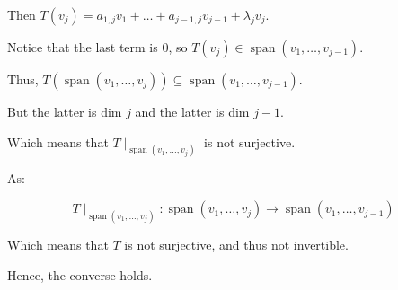 {{{			Then \(T(v_{j}) = a_{1,j} v_1 + \ldots + a_{j-1,j} v_{j-1} + \lambda_{j} v_{j}\).

			Notice that the last term is \(0\), so \(T(v_{j}) \in \operatorname{span}\left( v_1, \ldots, v_{j-1} \right) \).

			Thus, \( T(\operatorname{span}\left( v_1, \ldots, v_{j} \right)) \subseteq \operatorname{span}\left( v_1, \ldots, v_{j-1} \right) \).

			But the latter is dim \(j\) and the latter is dim \(j - 1\).

			Which means that \(T \mid_{\operatorname{span}\left( v_1, \ldots, v_{j} \right) }\) is not surjective.

			As:

			\[
				T \mid_{\operatorname{span}\left( v_1, \ldots, v_{j} \right) } : \operatorname{span}\left( v_1, \ldots, v_{j} \right) \to \operatorname{span}\left( v_1, \ldots, v_{j-1} \right)
			\]

			Which means that \(T\) is not surjective, and thus not invertible.

			Hence, the converse holds.

		}
	}
}


